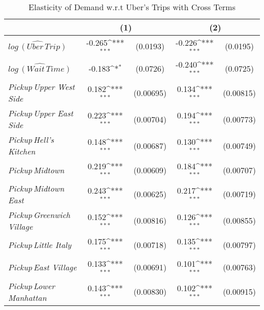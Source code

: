 \begin{table}[h]
\caption{Elasticity of Demand w.r.t Uber's Trips with Cross Terms}\label{tab:lnuber_cross_regression}\\




{
\def\sym#1{\ifmmode^{#1}\else\(^{#1}\)\fi}
\begin{center}
\begin{tabular}{l*{2}{cc}}
\hline\hline
            &\multicolumn{2}{c}{(1)}           &\multicolumn{2}{c}{(2)}           \\

\hline
${\widehat{log\, (Uber\,Trip)}}$  &      -0.265\sym{***}&    (0.0193)&      -0.226\sym{***}&    (0.0195)\\
${\widehat{log\, (Wait\, Time)}}$&      -0.183\sym{*}  &    (0.0726)&      -0.240\sym{***}&    (0.0725)\\
\hspace{3cm}\textit{Pickup\,Upper West Side}&       0.182\sym{***}&   (0.00695)&       0.134\sym{***}&   (0.00815)\\
\hspace{3cm}\textit{Pickup\,Upper East Side}&       0.223\sym{***}&   (0.00704)&       0.194\sym{***}&   (0.00773)\\
\hspace{3cm}\textit{Pickup\,Hell's Kitchen}&       0.148\sym{***}&   (0.00687)&       0.130\sym{***}&   (0.00749)\\
\hspace{3cm}\textit{Pickup\,Midtown}&       0.219\sym{***}&   (0.00609)&       0.184\sym{***}&   (0.00707)\\
\hspace{3cm}\textit{Pickup\,Midtown East}&       0.243\sym{***}&   (0.00625)&       0.217\sym{***}&   (0.00719)\\
\hspace{3cm}\textit{Pickup\,Greenwich Village}&       0.152\sym{***}&   (0.00816)&       0.126\sym{***}&   (0.00855)\\
\hspace{3cm}\textit{Pickup\,Little Italy}&       0.175\sym{***}&   (0.00718)&       0.135\sym{***}&   (0.00797)\\
\hspace{3cm}\textit{Pickup\,East Village}&       0.133\sym{***}&   (0.00691)&       0.101\sym{***}&   (0.00763)\\
\hspace{3cm}\textit{Pickup\,Lower Manhattan}&       0.143\sym{***}&   (0.00830)&       0.102\sym{***}&   (0.00915)\\

\end{tabular}
\end{center}}
\end{table}
